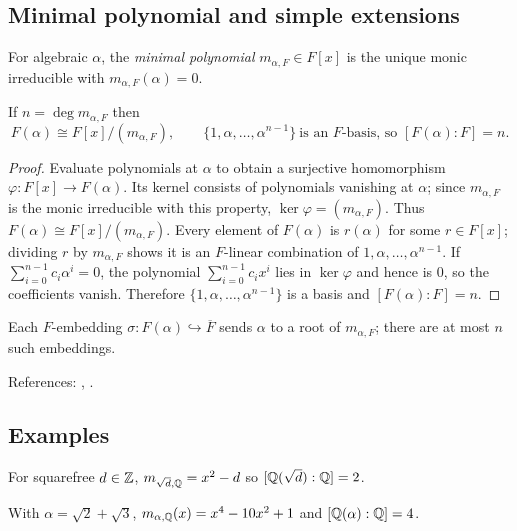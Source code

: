 \subsection{Minimal polynomial and simple extensions}
\begin{definition}
For algebraic $\alpha$, the \emph{minimal polynomial} $m_{\alpha,F}\in F[x]$ is the unique monic irreducible with $m_{\alpha,F}(\alpha)=0$.
\end{definition}
\begin{proposition}[Structure]\label{prop:simple}
If $n=\deg m_{\alpha,F}$ then
\[
F(\alpha)\cong F[x]/(m_{\alpha,F}),\qquad
\{1,\alpha,\dots,\alpha^{n-1}\}\ \text{is an $F$-basis, so } [F(\alpha)\!:\!F]=n.
\]
\end{proposition}
\begin{proof}
Evaluate polynomials at $\alpha$ to obtain a surjective homomorphism $\varphi:F[x]\to F(\alpha)$. Its kernel consists of polynomials vanishing at $\alpha$; since $m_{\alpha,F}$ is the monic irreducible with this property, $\ker\varphi=(m_{\alpha,F})$.
Thus $F(\alpha)\cong F[x]/(m_{\alpha,F})$.
Every element of $F(\alpha)$ is $r(\alpha)$ for some $r\in F[x]$; dividing $r$ by $m_{\alpha,F}$ shows it is an $F$-linear combination of $1,\alpha,\dots,\alpha^{n-1}$.
If $\sum_{i=0}^{n-1}c_i\alpha^i=0$, the polynomial $\sum_{i=0}^{n-1}c_ix^i$ lies in $\ker\varphi$ and hence is $0$, so the coefficients vanish.
Therefore $\{1,\alpha,\dots,\alpha^{n-1}\}$ is a basis and $[F(\alpha)\!:\!F]=n$.
\end{proof}
\begin{remark}[Conjugates]
Each $F$-embedding $\sigma:F(\alpha)\hookrightarrow \overline{F}$ sends $\alpha$ to a root of $m_{\alpha,F}$; there are at most $n$ such embeddings.
\end{remark}
References: \cite[\S13--14]{DF}, \cite[Ch.~V]{Artin}.

\subsection{Examples}
\begin{example}
For squarefree $d\in\mathbb{Z}$, $m_{\sqrt d,\mathbb{Q}}=x^2-d$ so $[\mathbb{Q}(\sqrt d):\mathbb{Q}]=2$.
\end{example}
\begin{example}
With $\alpha=\sqrt2+\sqrt3$, $m_{\alpha,\mathbb{Q}}(x)=x^4-10x^2+1$ and $[\mathbb{Q}(\alpha):\mathbb{Q}]=4$.
\end{example}
